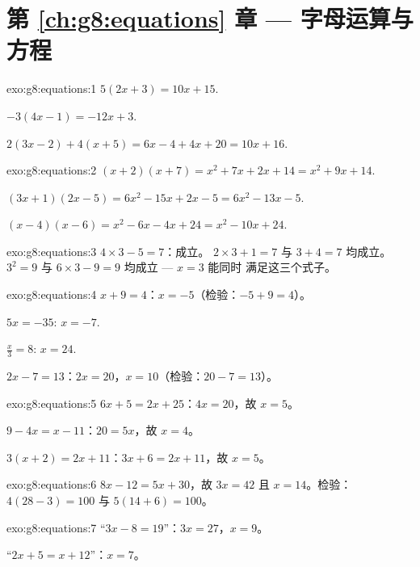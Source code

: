 \section*{第 \ref{ch:g8:equations} 章 --- 字母运算与方程}

\begin{solution}{exo:g8:equations:1}
$5(2x + 3) = 10x + 15$.

$-3(4x - 1) = -12x + 3$.

$2(3x - 2) + 4(x + 5) = 6x - 4 + 4x + 20 = 10x + 16$.
\end{solution}

\begin{solution}{exo:g8:equations:2}
$(x+2)(x+7) = x^2 + 7x + 2x + 14 = x^2 + 9x + 14$.

$(3x+1)(2x-5) = 6x^2 - 15x + 2x - 5 = 6x^2 - 13x - 5$.

$(x-4)(x-6) = x^2 - 6x - 4x + 24 = x^2 - 10x + 24$.
\end{solution}

\begin{solution}{exo:g8:equations:3}
$4 \times 3 - 5 = 7$：成立。 \quad
$2 \times 3 + 1 = 7$ 与 $3 + 4 = 7$ 均成立。 \quad
$3^2 = 9$ 与 $6 \times 3 - 9 = 9$ 均成立 --- $x = 3$ 能同时
满足这三个式子。
\end{solution}

\begin{solution}{exo:g8:equations:4}
$x + 9 = 4$：$x = -5$（检验：$-5 + 9 = 4$）。

$5x = -35$: $x = -7$.

$\frac x3 = 8$: $x = 24$.

$2x - 7 = 13$：$2x = 20$，$x = 10$（检验：$20 - 7 = 13$）。
\end{solution}

\begin{solution}{exo:g8:equations:5}
$6x + 5 = 2x + 25$：$4x = 20$，故 $x = 5$。

$9 - 4x = x - 11$：$20 = 5x$，故 $x = 4$。

$3(x + 2) = 2x + 11$：$3x + 6 = 2x + 11$，故 $x = 5$。
\end{solution}

\begin{solution}{exo:g8:equations:6}
$8x - 12 = 5x + 30$，故 $3x = 42$ 且 $x = 14$。检验：
$4(28 - 3) = 100$ 与 $5(14 + 6) = 100$。
\end{solution}

\begin{solution}{exo:g8:equations:7}
“$3x - 8 = 19$”：$3x = 27$，$x = 9$。

“$2x + 5 = x + 12$”：$x = 7$。
\end{solution}

